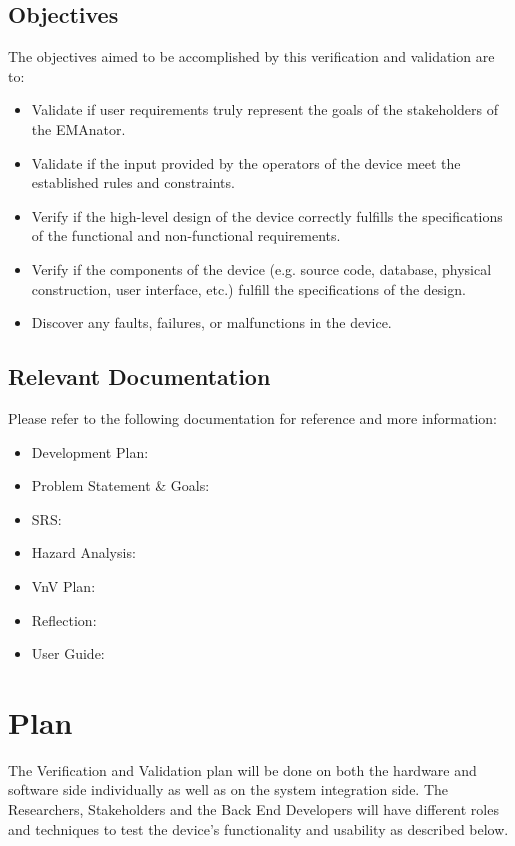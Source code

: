 \documentclass[12pt, titlepage]{article}
\begin{document}
\subsection{Objectives}

The objectives aimed to be accomplished by this verification and validation are to:

\begin{itemize}
  \item Validate if user requirements truly represent the goals of the stakeholders of the EMAnator.
  \item Validate if the input provided by the operators of the device meet the established rules and constraints.
  \item Verify if the high-level design of the device correctly fulfills the specifications of the functional and non-functional requirements.
  \item Verify if the components of the device (e.g. source code, database, physical construction, user interface, etc.) fulfill the specifications of the design.
  \item Discover any faults, failures, or malfunctions in the device.
\end{itemize}

\subsection{Relevant Documentation}

Please refer to the following documentation for reference and more information:

\begin{itemize}
  \item Development Plan: \citet{Development_Plan}
  \item Problem Statement \& Goals: \citet{Prob_n_Goals}
  \item SRS: \citet{SRS}
  \item Hazard Analysis: \citet{Hazard_Analysis}
  \item VnV Plan: \citet{VnV_Plan}
  \item Reflection: \citet{Reflection}
  \item User Guide: \citet{User_Guide}
\end{itemize}

\section{Plan}

The Verification and Validation plan will be done on both the hardware and software side individually as well as on the system integration side. The Researchers, Stakeholders and the Back End Developers will have different roles and techniques to test the device's functionality and usability as described below.
\end{document}
